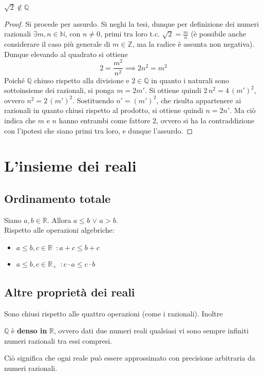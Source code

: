 \documentclass[10pt]{article}
\theoremstyle{plain}
\begin{document}
\begin{prop}
$\sqrt{2} \notin \mathbb{Q}$
\end{prop}
\begin{proof}
Si procede per assurdo. Si neghi la tesi, dunque per definizione dei numeri razionali $\exists m, n \in \mathbb{N}$, con $n \neq 0$, primi tra loro t.c. $\sqrt{2} = \frac{m}{n}$ (è possibile anche considerare il caso più generale di $m \in \mathbb{Z}$, ma la radice è assunta non negativa). Dunque elevando al quadrato si ottiene
\[2 = \frac{m^2}{n^2} \implies 2n^2 = m^2\]
Poiché $\mathbb{Q}$ chiuso rispetto alla divisione e $2 \in \mathbb{Q}$ in quanto i naturali sono sottoinsieme dei razionali, si ponga $m = 2m'$. Si ottiene quindi $2 \, n^2 = 4 \, (m')^2$, ovvero $n^2 = 2 \, (m')^2$. Sostituendo $n' = (m')^2$, che risulta appartenere ai razionali in quanto chiusi rispetto al prodotto, si ottiene quindi $n = 2 n'$. Ma ciò indica che $m$ e $n$ hanno entrambi come fattore $2$, ovvero si ha la contraddizione con l'ipotesi che siano primi tra loro, e dunque l'assurdo.
\end{proof}

\section{L'insieme dei reali}
\subsection{Ordinamento totale}
\begin{prop}
    Siano $a, b \in \mathbb{R}$. Allora $a \leq b$ $\lor$ $a > b$.
    \\Rispetto alle operazioni algebriche:
    \begin{itemize}[label = $\square$]
        \item $a \leq b, c \in \mathbb{R} \enspace : a + c \leq b + c$
        \item $a \leq b, c \in \mathbb{R}_+ \enspace : c \cdot a \leq c \cdot b$
    \end{itemize}
\end{prop}

\subsection{Altre proprietà dei reali}
Sono chiusi rispetto alle quattro operazioni (come i razionali). Inoltre 
\begin{prop}
$\mathbb{Q}$ è \textbf{denso in} $\mathbb{R}$, ovvero dati due numeri reali qualsiasi vi sono sempre infiniti numeri razionali tra essi compresi.
\end{prop}
Ciò significa che ogni reale può essere approssimato con precisione arbitraria da numeri razionali.
\end{document}
